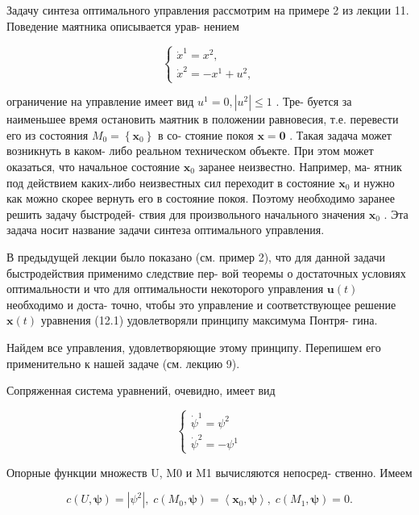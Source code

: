 \documentclass[8pt]{extarticle}
\begin{document}
Задачу синтеза оптимального управления рассмотрим на примере 2 из лекции 11. Поведение маятника описывается урав- нением

\[
\left\{  \begin{array}{l} {\dot{x}}^{1} = {x}^{2}, \\  {\dot{x}}^{2} =  - {x}^{1} + {u}^{2}, \end{array}\right. \tag{12.1}
\]

ограничение на управление имеет вид \({u}^{1} = 0,\left| {u}^{2}\right|  \leq  1\) . Тре- буется за наименьшее время остановить маятник в положении равновесия, т.е. перевести его из состояния \({M}_{0} = \left\{  {\mathbf{x}}_{0}\right\}\) в со- стояние покоя \(\mathbf{x} = \mathbf{0}\) . Такая задача может возникнуть в каком- либо реальном техническом объекте. При этом может оказаться, что начальное состояние \({\mathbf{x}}_{0}\) заранее неизвестно. Например, ма- ятник под действием каких-либо неизвестных сил переходит в состояние \({\mathbf{x}}_{0}\) и нужно как можно скорее вернуть его в состояние покоя. Поэтому необходимо заранее решить задачу быстродей- ствия для произвольного начального значения \({\mathbf{x}}_{0}\) . Эта задача носит название задачи синтеза оптимального управления.

В предыдущей лекции было показано (см. пример 2), что для данной задачи быстродействия применимо следствие пер- вой теоремы о достаточных условиях оптимальности и что для оптимальности некоторого управления \(\mathbf{u}\left( t\right)\) необходимо и доста- точно, чтобы это управление и соответствующее решение \(\mathbf{x}\left( t\right)\) уравнения (12.1) удовлетворяли принципу максимума Понтря- гина.

Найдем все управления, удовлетворяющие этому принципу. Перепишем его применительно к нашей задаче (см. лекцию 9).

Сопряженная система уравнений, очевидно, имеет вид

\[
\left\{  \begin{array}{l} {\dot{\psi }}^{1} = {\psi }^{2} \\  {\dot{\psi }}^{2} =  - {\psi }^{1} \end{array}\right. \tag{12.2}
\]

Опорные функции множеств U, M0 и M1 вычисляются непосред- ственно. Имеем

\[
c\left( {U,\mathbf{\psi }}\right)  = \left| {\psi }^{2}\right| ,\;c\left( {{M}_{0},\mathbf{\psi }}\right)  = \left\langle  {{\mathbf{x}}_{0},\mathbf{\psi }}\right\rangle  ,\;c\left( {{M}_{1},\mathbf{\psi }}\right)  = 0.
\]
\end{document}
